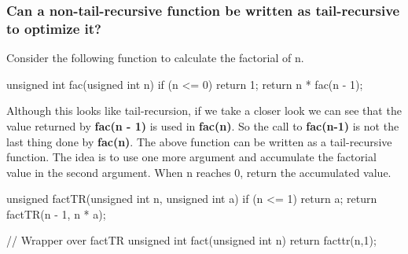 \documentclass{report}
\begin{document}
\subsubsection*{Can a non-tail-recursive function be written as tail-recursive to optimize it?}
Consider the following function to calculate the factorial of n.
\begin{cppcode}
  unsigned int fac(usigned int n) {
    if (n <= 0)
      return 1;
    return n * fac(n - 1);
  }
\end{cppcode}
\noindent Although this looks like tail-recursion, if we take a closer look we can see that the value returned by \textbf{fac(n - 1)} is used in \textbf{fac(n)}. So the call to \textbf{fac(n-1)} is not the last thing done by \textbf{fac(n)}.
The above function can be written as a tail-recursive function. The idea is to use one more argument and accumulate the factorial value in the second argument. When n reaches 0, return the accumulated value.
\begin{cppcode}
  unsigned factTR(unsigned int n, unsigned int a) {
    if (n <= 1)
      return a;
    return factTR(n - 1, n * a);
  }

  // Wrapper over factTR
  unsigned int fact(unsigned int n) { return facttr(n,1); }
\end{cppcode}
\end{document}
